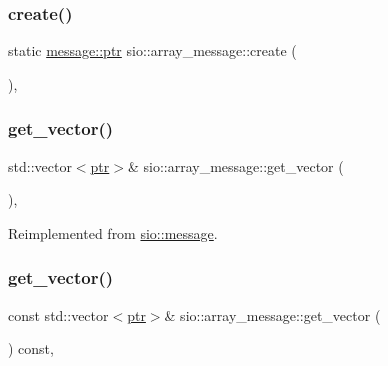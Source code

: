 \mbox{\label{classsio_1_1array__message_ae39847edc10bcfc748257485a57382f5}} 
\subsubsection{\texorpdfstring{create()}{create()}}
{\footnotesize\ttfamily static \hyperlink{classsio_1_1message_a6340b6fef57e4516eb17928b1885a615}{message\+::ptr} sio\+::array\+\_\+message\+::create (\begin{DoxyParamCaption}{ }\end{DoxyParamCaption})\hspace{0.3cm}{\ttfamily [inline]}, {\ttfamily [static]}}

\mbox{\label{classsio_1_1array__message_a7d039c4e78bb01f5e19921e0f09509c2}} 
\subsubsection{\texorpdfstring{get\+\_\+vector()}{get\_vector()}\hspace{0.1cm}{\footnotesize\ttfamily [1/2]}}
{\footnotesize\ttfamily std\+::vector$<$\hyperlink{classsio_1_1message_a6340b6fef57e4516eb17928b1885a615}{ptr}$>$\& sio\+::array\+\_\+message\+::get\+\_\+vector (\begin{DoxyParamCaption}{ }\end{DoxyParamCaption})\hspace{0.3cm}{\ttfamily [inline]}, {\ttfamily [virtual]}}



Reimplemented from \hyperlink{classsio_1_1message_af62004da998c98ee7039a26d809c44d3}{sio\+::message}.

\mbox{\label{classsio_1_1array__message_a298e6b4d041e95ac5b90cdff6fdef5fb}} 
\subsubsection{\texorpdfstring{get\+\_\+vector()}{get\_vector()}\hspace{0.1cm}{\footnotesize\ttfamily [2/2]}}
{\footnotesize\ttfamily const std\+::vector$<$\hyperlink{classsio_1_1message_a6340b6fef57e4516eb17928b1885a615}{ptr}$>$\& sio\+::array\+\_\+message\+::get\+\_\+vector (\begin{DoxyParamCaption}{ }\end{DoxyParamCaption}) const\hspace{0.3cm}{\ttfamily [inline]}, {\ttfamily [virtual]}}



